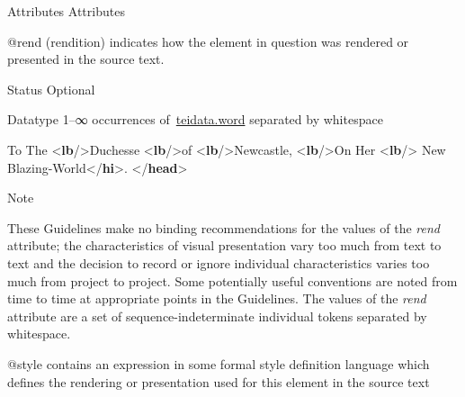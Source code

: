 \begin{reflist}
    \item[{Attributes}]
  Attributes\hfil\\[-10pt]\begin{sansreflist}
    \item[@rend]
  (rendition) indicates how the element in question was rendered or presented in the source text.
\begin{reflist}
    \item[{Status}]
  Optional
    \item[{Datatype}]
  1–∞ occurrences of \hyperref[TEI.teidata.word]{teidata.word} separated by whitespace
    \item[]\mbox{}\newline 
{}To The {<\textbf{lb}/>}Duchesse {<\textbf{lb}/>}of {<\textbf{lb}/>}Newcastle,\mbox{}\newline 
{<\textbf{lb}/>}On Her {<\textbf{lb}/>}\mbox{}\newline 
{}New Blazing-World{</\textbf{hi}>}. \mbox{}\newline 
{</\textbf{head}>}
    \item[{Note}]
  \par
These Guidelines make no binding recommendations for the values of the {\itshape rend} attribute; the characteristics of visual presentation vary too much from text to text and the decision to record or ignore individual characteristics varies too much from project to project. Some potentially useful conventions are noted from time to time at appropriate points in the Guidelines. The values of the {\itshape rend} attribute are a set of sequence-indeterminate individual tokens separated by whitespace.
\end{reflist}  
    \item[@style]
  contains an expression in some formal style definition language which defines the rendering or presentation used for this element in the source text
\begin{reflist}

\end{reflist}
\end{sansreflist}
\end{reflist}
